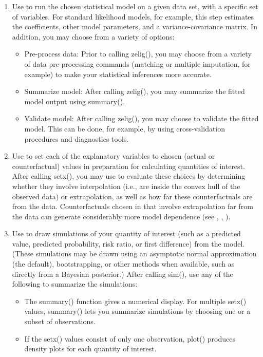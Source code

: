 \documentclass[letterpaper,10pt,english]{sphinxmanual}
\begin{document}
\begin{enumerate}
\item {} 
Use  to run the chosen statistical model on a given data
set, with a specific set of variables. For standard likelihood
models, for example, this step estimates the coefficients, other
model parameters, and a variance-covariance matrix. In addition, you
may choose from a variety of options:
\begin{itemize}
\item {} 
Pre-process data: Prior to calling zelig(), you may choose from a
variety of data pre-processing commands (matching or multiple
imputation, for example) to make your statistical inferences more
accurate.

\item {} 
Summarize model: After calling zelig(), you may summarize the
fitted model output using summary().

\item {} 
Validate model: After calling zelig(), you may choose to validate
the fitted model. This can be done, for example, by using
cross-validation procedures and diagnostics tools.

\end{itemize}

\item {} 
Use  to set each of the explanatory variables to chosen
(actual or counterfactual) values in preparation for calculating
quantities of interest. After calling setx(), you may use to evaluate
these choices by determining whether they involve interpolation
(i.e., are inside the convex hull of the observed data) or
extrapolation, as well as how far these counterfactuals are from the
data. Counterfactuals chosen in  that involve extrapolation
far from the data can generate considerably more model dependence
(see , , ).

\item {} 
Use  to draw simulations of your quantity of interest (such
as a predicted value, predicted probability, risk ratio, or first
difference) from the model. (These simulations may be drawn using an
asymptotic normal approximation (the default), bootstrapping, or
other methods when available, such as directly from a Bayesian
posterior.) After calling sim(), use any of the following to
summarize the simulations:
\begin{itemize}
\item {} 
The summary() function gives a numerical display. For multiple
setx() values, summary() lets you summarize simulations by
choosing one or a subset of observations.

\item {} 
If the setx() values consist of only one observation, plot()
produces density plots for each quantity of interest.

\end{itemize}

\end{enumerate}
\end{document}
